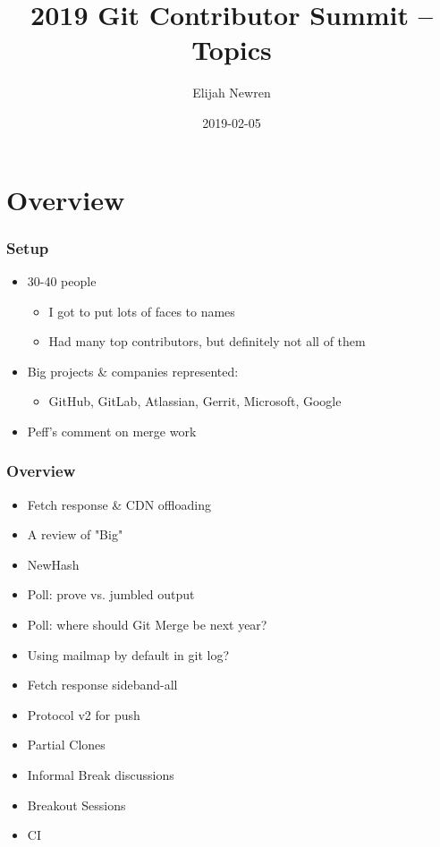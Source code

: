 \documentclass[t]{beamer}
\title{2019 Git Contributor Summit -- Topics}
\author{Elijah Newren}
\institute{Palantir Technologies}
\date{2019-02-05}
\begin{document}
\begin{frame}
  \titlepage
\end{frame}


\section{Overview}

\begin{frame}
  \frametitle{Setup}

  \begin{itemize}
    \item 30-40 people
    \begin{itemize}
      \item I got to put lots of faces to names
      \item Had many top contributors, but definitely not all of them
    \end{itemize}
    \item Big projects \& companies represented:
      \begin{itemize}
        \item GitHub, GitLab, Atlassian, Gerrit, Microsoft, Google
      \end{itemize}
    \item Peff's comment on merge work
  \end{itemize}
  
\end{frame}

\begin{frame}
  \frametitle{Overview}

  \begin{itemize}
    \item Fetch response \& CDN offloading
    \item A review of "Big"
    \item NewHash
    \item Poll: prove vs. jumbled output
    \item Poll: where should Git Merge be next year?
    \item Using mailmap by default in git log?
    \item Fetch response sideband-all
    \item Protocol v2 for push
    \item Partial Clones
    \item Informal Break discussions
    \item Breakout Sessions
    \item CI
  \end{itemize}

\end{frame}
\end{document}
